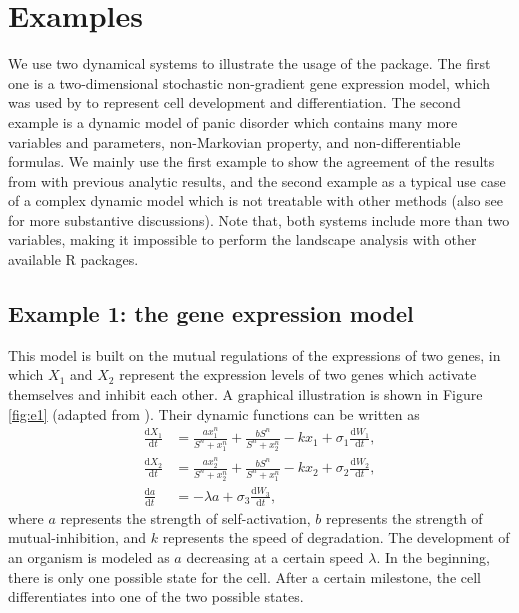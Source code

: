 \section{Examples}\label{examples}

We use two dynamical systems to illustrate the usage of the  package. The first one is a two-dimensional stochastic non-gradient gene expression model, which was used by \citet{wangQuantifyingWaddingtonLandscape2011} to represent cell development and differentiation. The second example is a dynamic model of panic disorder \citep{robinaugh2024} which contains many more variables and parameters, non-Markovian property, and non-differentiable formulas. We mainly use the first example to show the agreement of the results from  with previous analytic results, and the second example as a typical use case of a complex dynamic model which is not treatable with other methods (also see \citet{CuiEtAlMetaphorComputationConstructing2021} for more substantive discussions). Note that, both systems include more than two variables, making it impossible to perform the landscape analysis with other available R packages.

\subsection{Example 1: the gene expression model}\label{example-1-the-gene-expression-model}

This model is built on the mutual regulations of the expressions of two genes, in which \(X_1\) and \(X_2\) represent the expression levels of two genes which activate themselves and inhibit each other. A graphical illustration is shown in Figure \ref{fig:e1} (adapted from \citet{wangQuantifyingWaddingtonLandscape2011}). Their dynamic functions can be written as
\begin{align}
\frac {\mathrm{d}X_ {1}}{\mathrm{d}t}  &=  \frac {ax_ {1}^ {n}}{S^ {n}+x_ {1}^ {n}} + \frac {bS^ {n}}{S^ {n}+x_ {2}^ {n}} - kx_ {1}+ \sigma_1 \frac{\mathrm{d}W_1}{\mathrm{d}t},
\label{eq:sim2x1}
\\
\frac {\mathrm{d}X_ {2}}{\mathrm{d}t}  &=  \frac {ax_ {2}^ {n}}{S^ {n}+x_ {2}^ {n}} + \frac {bS^ {n}}{S^ {n}+x_ {1}^ {n}} - kx_ {2}+ \sigma_2 \frac{\mathrm{d}W_2}{\mathrm{d}t},
\label{eq:sim2x2}
\\
\frac {\mathrm{d}a}{\mathrm{d}t} &= -\lambda a+ \sigma_3 \frac{\mathrm{d}W_3}{\mathrm{d}t},
\label{eq:sim2a}
\end{align}
where \(a\) represents the strength of self-activation, \(b\) represents the strength of mutual-inhibition, and \(k\) represents the speed of degradation. The development of an organism is modeled as \(a\) decreasing at a certain speed \(\lambda\). In the beginning, there is only one possible state for the cell. After a certain milestone, the cell differentiates into one of the two possible states.

